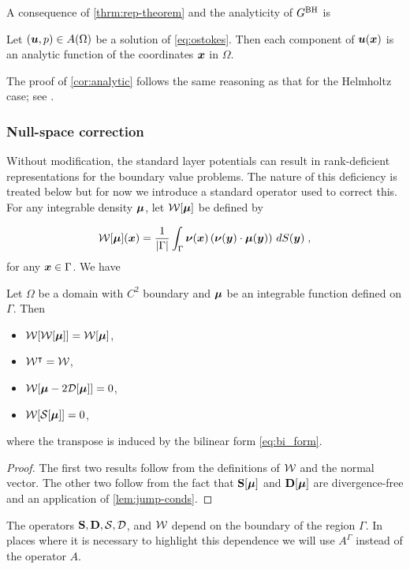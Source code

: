 A consequence of \cref{thrm:rep-theorem} and the analyticity
of $G^{\textrm{BH}}$ is 
\begin{cor}
\label{cor:analytic}  
  Let $({\boldsymbol u},p) \in A(\Omega)$ be a solution of \cref{eq:ostokes}.
  Then each component of ${\boldsymbol u}({\boldsymbol x})$ is an analytic function
  of the coordinates ${\boldsymbol x}$ in $\Omega$.
\end{cor}

The proof of \cref{cor:analytic} follows the same reasoning as
that for the Helmholtz case; see \cite[Theorem 3.5]{colton1983integral}.


\subsubsection{Null-space correction \label{subsubsec:nullspacecorr}}

Without modification, the standard layer potentials
can result in rank-deficient representations for
the boundary value problems. The nature of this deficiency
is treated below but for now we introduce a standard
operator used to correct this. For any integrable density
${\boldsymbol \mu}$, let ${\mathcal W}[{\boldsymbol \mu}]$ be defined by

\begin{equation} \label{eq:ones_operator}
  {\mathcal W}[{\boldsymbol \mu}]({\boldsymbol x}) = \frac{1}{|\Gamma|} \int_\Gamma {\boldsymbol \nu}({\boldsymbol x})
  \left ( {\boldsymbol \nu}({\boldsymbol y}) \cdot {\boldsymbol \mu}({\boldsymbol y}) \right )
  \, dS({\boldsymbol y}) \; ,
\end{equation}
for any ${\boldsymbol x} \in \Gamma$. We have

\begin{lem}
  \label{lem:propnullspacecorr}

  Let $\Omega$ be a domain with $C^2$ boundary and ${\boldsymbol \mu}$ be
  an integrable function defined on $\Gamma$. Then
  \begin{itemize}
  \item ${\mathcal W}[{\mathcal W}[{\boldsymbol \mu}]] = {\mathcal W}[{\boldsymbol \mu}]$,
  \item ${\mathcal W}^\intercal = {\mathcal W}$,
  \item ${\mathcal W}[{\boldsymbol \mu} - 2 {\mathcal D}[{\boldsymbol \mu}]] = 0$,
  \item ${\mathcal W}[{\mathcal S}[{\boldsymbol \mu}]] = 0$,
  \end{itemize}
  where the transpose is induced by the bilinear
  form \cref{eq:bi_form}.
\end{lem}

\begin{proof}
  The first two results follow from the definitions of ${\mathcal W}$ and
  the normal vector. The other two follow from the fact that
  ${\bf S}[{\boldsymbol \mu}]$ and ${\bf D}[{\boldsymbol \mu}]$ are divergence-free and
  an application of \cref{lem:jump-conds}.
\end{proof}

\begin{remark}
The operators ${\bf S},{\bf D}, {\mathcal S}, {\mathcal D}$, and ${\mathcal W}$  depend on the boundary 
of the region $\Gamma$. In places where it is necessary to highlight this dependence
we will use $A^{\Gamma}$ instead of the operator $A$.
\end{remark}
